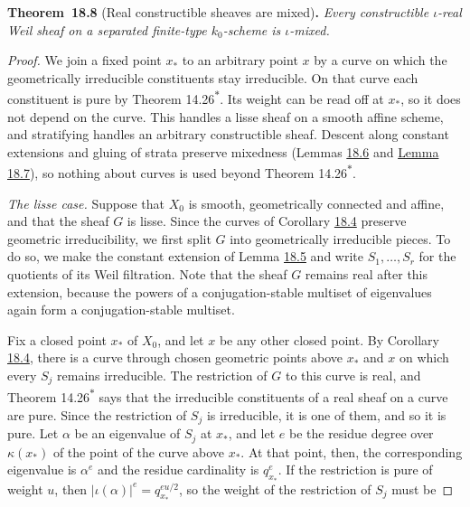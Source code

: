 \documentclass[11pt]{article}
\newenvironment{bpstatement}[2]{\par\addvspace{0.6\baselineskip}\noindent\textbf{#1}#2\textbf{.}\enspace\ignorespaces}
  {\par\addvspace{0.4\baselineskip}}
\newenvironment{bpstatementit}[2]{\begin{bpstatement}{#1}{#2}\itshape\ignorespaces}{\end{bpstatement}}
\newcommand{\bpout}[1]{#1\textsuperscript{\hyperlink{bp-outside}{\ensuremath{\ast}}}}
\begin{document}
\label{bp25}%
\begin{bpstatementit}{Theorem~18.8}{ (Real constructible sheaves are mixed)}
Every constructible \(\iota\)-real Weil sheaf on a separated finite-type \(k_0\)-scheme is \(\iota\)-mixed.
\end{bpstatementit}

\begin{proof}[{Proof}]\label{bp26}%
We join a fixed point \(x_*\) to an arbitrary point \(x\) by a curve on which the geometrically irreducible constituents stay irreducible. On that curve each constituent is pure by Theorem \bpout{14.26}. Its weight can be read off at \(x_*\), so it does not depend on the curve. This handles a lisse sheaf on a smooth affine scheme, and stratifying handles an arbitrary constructible sheaf. Descent along constant extensions and gluing of strata preserve mixedness (Lemmas \hyperref[bp21]{18.6} and \hyperref[bp23]{Lemma 18.7}), so nothing about curves is used beyond Theorem \bpout{14.26}.

\emph{The lisse case.} Suppose that \(X_0\) is smooth, geometrically connected and affine, and that the sheaf \(G\) is lisse. Since the curves of Corollary \hyperref[bp14]{18.4} preserve geometric irreducibility, we first split \(G\) into geometrically irreducible pieces. To do so, we make the constant extension of Lemma \hyperref[bp18]{18.5} and write \(S_1,\ldots,S_r\) for the quotients of its Weil filtration. Note that the sheaf \(G\) remains real after this extension, because the powers of a conjugation-stable multiset of eigenvalues again form a conjugation-stable multiset.

Fix a closed point \(x_*\) of \(X_0\), and let \(x\) be any other closed point. By Corollary \hyperref[bp14]{18.4}, there is a curve through chosen geometric points above \(x_*\) and \(x\) on which every \(S_j\) remains irreducible. The restriction of \(G\) to this curve is real, and Theorem \bpout{14.26} says that the irreducible constituents of a real sheaf on a curve are pure. Since the restriction of \(S_j\) is irreducible, it is one of them, and so it is pure. Let \(\alpha\) be an eigenvalue of \(S_j\) at \(x_*\), and let \(e\) be the residue degree over \(\kappa(x_*)\) of the point of the curve above \(x_*\). At that point, then, the corresponding eigenvalue is \(\alpha^e\) and the residue cardinality is \(q_{x_*}^e\). If the restriction is pure of weight \(u\), then \(|\iota(\alpha)|^e=q_{x_*}^{eu/2}\), so the weight of the restriction of \(S_j\) must be


\end{proof}
\end{document}
